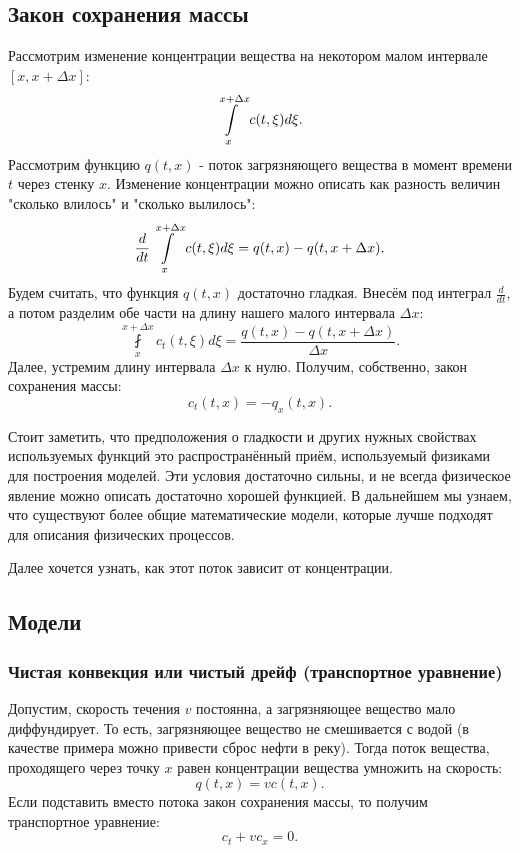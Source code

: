 \subsection{Закон сохранения массы}

Рассмотрим изменение концентрации вещества на некотором малом интервале $ [x, x + \Delta x] $:
$$ \displaystyle \int \limits_x^{x + \Delta x} c (t, \xi) d \xi .$$
Рассмотрим функцию $ q (t, x) $ - поток загрязняющего вещества в момент времени $t$ через стенку $x$. Изменение концентрации можно описать как разность величин "сколько влилось" и "сколько вылилось": 
$$ \frac {d} {dt} \displaystyle \int \limits_x^{x + \Delta x} c (t, \xi) d \xi = q (t, x) - q (t, x + \Delta x). $$
Будем считать, что функция $q (t, x) $ достаточно гладкая. Внесём под интеграл $ \displaystyle \frac {d} {dt} $, а потом разделим обе части на длину нашего малого интервала $ \Delta x$:
$$ \fint \limits_x^{x + \Delta x} c_t (t, \xi) d \xi  = \frac {q  (t, x) - q (t, x + \Delta x)} {\Delta x}.$$
Далее, устремим длину интервала $\Delta x$ к нулю. Получим, собственно, закон сохранения массы:
$$ c_t (t, x) = -q_x (t, x). $$

Стоит заметить, что предположения о гладкости и других нужных свойствах используемых функций это распространённый приём, используемый физиками для построения моделей. Эти условия достаточно сильны, и не всегда физическое явление можно описать достаточно хорошей функцией. В дальнейшем мы узнаем, что существуют более общие математические модели, которые лучше подходят для описания физических процессов.


Далее хочется узнать, как этот поток зависит от концентрации.

\subsection{Модели}
\subsubsection*{Чистая конвекция или чистый дрейф (транспортное уравнение)}

Допустим, скорость течения $v$ постоянна, а загрязняющее вещество мало диффундирует. То есть, загрязняющее вещество не смешивается с водой (в качестве примера можно привести сброс нефти в реку). Тогда поток вещества, проходящего через точку $x$ равен концентрации вещества умножить на скорость:
$$ q (t, x) = v c (t, x). $$
Если подставить вместо потока закон сохранения массы, то получим транспортное уравнение:
\begin{equation}
    c_t + v c_x = 0.
\end{equation}

